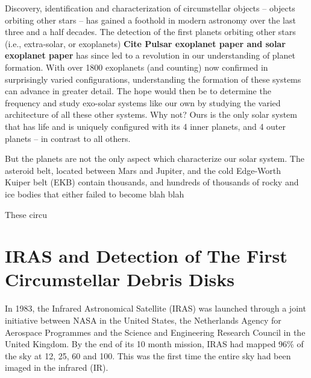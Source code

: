 
    
    Discovery, identification and characterization of circumstellar objects -- objects orbiting other stars -- has gained a foothold in modern astronomy over the last three and a half decades. The detection of the first planets orbiting other stars (i.e., extra-solar, or exoplanets) \textbf{Cite Pulsar exoplanet paper and solar exoplanet paper} has since led to a revolution in our understanding of planet formation. With over 1800 exoplanets (and counting) now confirmed in surprisingly varied configurations, understanding the formation of these systems can advance in greater detail. The hope would then be to determine the frequency and study exo-solar systems like our own by studying the varied architecture of all these other systems. Why not? Ours is the only solar system that has life and is uniquely configured with its 4 inner planets, and 4 outer planets -- in contrast to all others. 
    
    But the planets are not the only aspect which characterize our solar system. The asteroid belt, located between Mars and Jupiter, and the cold Edge-Worth Kuiper belt (EKB) contain thousands, and hundreds of thousands of rocky and ice bodies that either failed to become blah blah
    
    
    These circu
    
  
    \section{IRAS and Detection of The First Circumstellar Debris Disks }\label{sec:1stdisk_iras}
    
    In 1983, the Infrared Astronomical Satellite (IRAS) was launched through a joint initiative between NASA in the United States, the Netherlands Agency for Aerospace Programmes and the Science and Engineering Research Council in the United Kingdom. By the end of its 10 month mission, IRAS had mapped 96\% of the sky at 12, 25, 60 and 100\micron. This was the first time the entire sky had been imaged in the infrared (IR). 
    
